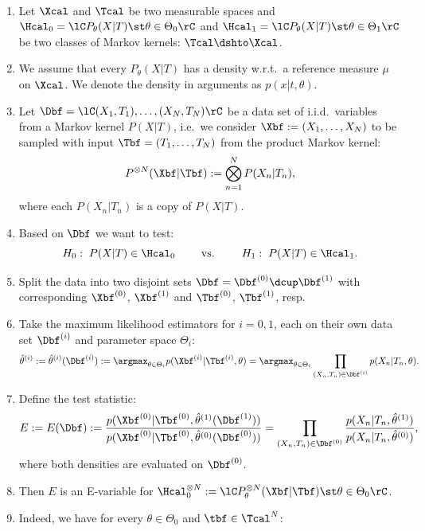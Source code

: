 \begin{Prn} $\,$
    \begin{enumerate}
\item Let $\Xcal$ and $\Tcal$ be two measurable spaces and $\Hcal_0=\lC P_\theta(X|T) \st \theta \in \Theta_0 \rC$
     and $\Hcal_1=\lC P_\theta(X|T) \st \theta \in \Theta_1 \rC$ 
    be two classes of Markov kernels: $\Tcal \dshto \Xcal$.
\item We assume that every $P_\theta(X|T)$ has a density w.r.t.\ a reference measure $\mu$ on $\Xcal$. 
      We denote the density in arguments as $p(x|t,\theta)$. %
\item Let $\Dbf = \lC (X_1,T_1),\dots,(X_N,T_N) \rC$ be a data set of i.i.d.\ variables from a Markov kernel $P(X|T)$, i.e.\
    we consider $\Xbf:=(X_1,\dots,X_N)$  to be sampled with input $\Tbf=(T_1,\dots,T_N)$ from the product Markov kernel:
    \[ P^{\otimes N}(\Xbf|\Tbf) := \bigotimes_{n=1}^N P(X_n|T_n), \]
    where each $P(X_n|T_n)$ is a copy of $P(X|T)$. 
\item Based on $\Dbf$ we want to test:
    \[ H_0:\; P(X|T) \in \Hcal_0 \qquad \text{ vs. } \qquad H_1:\; P(X|T) \in \Hcal_1. \]
\item Split the data into two disjoint sets $\Dbf = \Dbf^{(0)} \dcup \Dbf^{(1)}$ with corresponding $\Xbf^{(0)}$, $\Xbf^{(1)}$ 
    and $\Tbf^{(0)}$, $\Tbf^{(1)}$, resp. %
\item Take the maximum likelihood estimators for $i=0,1$, each on their own data set $\Dbf^{(i)}$ and parameter space $\Theta_i$:
    \[ \hat \theta^{(i)} := \hat \theta^{(i)}(\Dbf^{(i)}) := \argmax_{\theta \in \Theta_i}  p(\Xbf^{(i)}|\Tbf^{(i)},\theta) 
    = \argmax_{\theta \in \Theta_i} \prod_{(X_n,T_n) \in \Dbf^{(i)}} p(X_n|T_n,\theta). \]
\item Define the test statistic:
    \[ E := E(\Dbf) := \frac{p(\Xbf^{(0)}|\Tbf^{(0)},\hat \theta^{(1)}(\Dbf^{(1)}))}{p(\Xbf^{(0)}|\Tbf^{(0)},\hat \theta^{(0)}(\Dbf^{(0)}))} 
    = \prod_{(X_n,T_n) \in \Dbf^{(0)}} \frac{p(X_n|T_n,\hat\theta^{(1)})}{p(X_n|T_n,\hat\theta^{(0)})},  \]
    where both densities are evaluated on $\Dbf^{(0)}$.
\item Then $E$ is an E-variable for $\Hcal_0^{\otimes N} := \lC P_\theta^{\otimes N}(\Xbf|\Tbf) \st \theta \in \Theta_0 \rC$.
\item[] Indeed, we have for every $\theta \in \Theta_0$ and $\tbf \in \Tcal^N$:

\end{enumerate}
\end{Prn}
